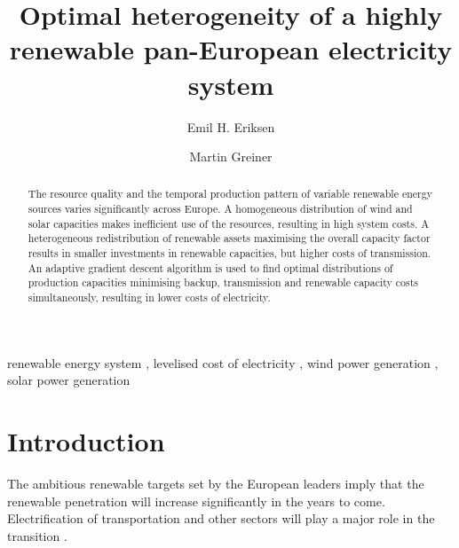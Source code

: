 \documentclass[a4paper, 5p, sort&compress]{elsarticle}%
\begin{document}
\begin{frontmatter}

\title{Optimal heterogeneity of a highly renewable pan-European electricity system}

\author[label1]{Emil H. Eriksen}
\author[label2,label3]{Martin Greiner}
\address[label1]{Department of Physics and Astronomy, Aarhus University, 8000 Aarhus C,  Denmark}
\address[label2]{Department of Mathematics, Aarhus University, 8000 Aarhus C,  Denmark}
\address[label3]{Department of Engineering, Aarhus University, 8200 Aarhus,  Denmark}


\begin{abstract}
  The resource quality and the temporal production pattern of variable
  renewable energy sources varies significantly across Europe. A
  homogeneous distribution of wind and solar capacities makes
  inefficient use of the resources, resulting in high system costs. A
  heterogeneous redistribution of renewable assets maximising the
  overall capacity factor results in smaller investments in renewable
  capacities, but higher costs of transmission. An adaptive gradient
  descent algorithm is used to find optimal distributions of
  production capacities minimising backup, transmission and renewable
  capacity costs simultaneously, resulting in lower costs of
  electricity.
\end{abstract}

\begin{keyword}
renewable energy system \sep 
levelised cost of electricity \sep
wind power generation \sep
solar power generation 
\end{keyword}

\end{frontmatter}


\section{Introduction}
\label{sec:one}

The ambitious renewable targets set by the European
leaders \cite{eu2050} imply that the renewable penetration will
increase significantly in the years to come. Electrification of
transportation and other sectors will play a major role in the
transition \cite{Williams12,ecf2050}.
\end{document}
